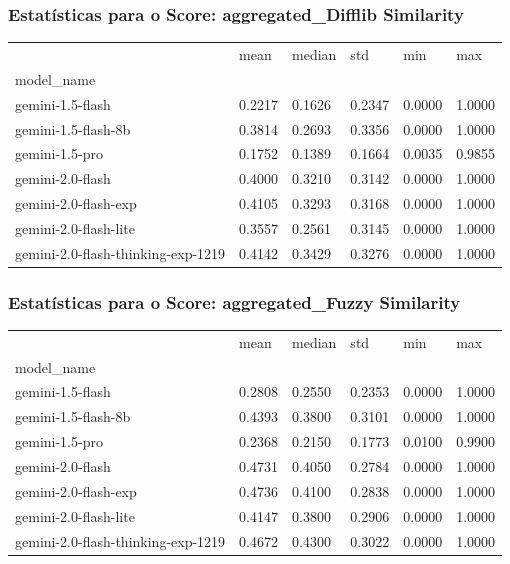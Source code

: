 \documentclass{article}%
\begin{document}
\subsubsection*{Estatísticas para o Score: aggregated\_Difflib Similarity}%
\begin{table}[H]%
\centering%
\begin{tabular}{llllll}
\toprule
 & mean & median & std & min & max \\
model_name &  &  &  &  &  \\
\midrule
gemini-1.5-flash & 0.2217 & 0.1626 & 0.2347 & 0.0000 & 1.0000 \\
gemini-1.5-flash-8b & 0.3814 & 0.2693 & 0.3356 & 0.0000 & 1.0000 \\
gemini-1.5-pro & 0.1752 & 0.1389 & 0.1664 & 0.0035 & 0.9855 \\
gemini-2.0-flash & 0.4000 & 0.3210 & 0.3142 & 0.0000 & 1.0000 \\
gemini-2.0-flash-exp & 0.4105 & 0.3293 & 0.3168 & 0.0000 & 1.0000 \\
gemini-2.0-flash-lite & 0.3557 & 0.2561 & 0.3145 & 0.0000 & 1.0000 \\
gemini-2.0-flash-thinking-exp-1219 & 0.4142 & 0.3429 & 0.3276 & 0.0000 & 1.0000 \\
\bottomrule
\end{tabular}
%
\end{table}%
\vspace{0.5cm}%
\subsubsection*{Estatísticas para o Score: aggregated\_Fuzzy Similarity}%
\begin{table}[H]%
\centering%
\begin{tabular}{llllll}
\toprule
 & mean & median & std & min & max \\
model_name &  &  &  &  &  \\
\midrule
gemini-1.5-flash & 0.2808 & 0.2550 & 0.2353 & 0.0000 & 1.0000 \\
gemini-1.5-flash-8b & 0.4393 & 0.3800 & 0.3101 & 0.0000 & 1.0000 \\
gemini-1.5-pro & 0.2368 & 0.2150 & 0.1773 & 0.0100 & 0.9900 \\
gemini-2.0-flash & 0.4731 & 0.4050 & 0.2784 & 0.0000 & 1.0000 \\
gemini-2.0-flash-exp & 0.4736 & 0.4100 & 0.2838 & 0.0000 & 1.0000 \\
gemini-2.0-flash-lite & 0.4147 & 0.3800 & 0.2906 & 0.0000 & 1.0000 \\
gemini-2.0-flash-thinking-exp-1219 & 0.4672 & 0.4300 & 0.3022 & 0.0000 & 1.0000 \\
\bottomrule
\end{tabular}
%
\end{table}%
\vspace{0.5cm}%
\end{document}
